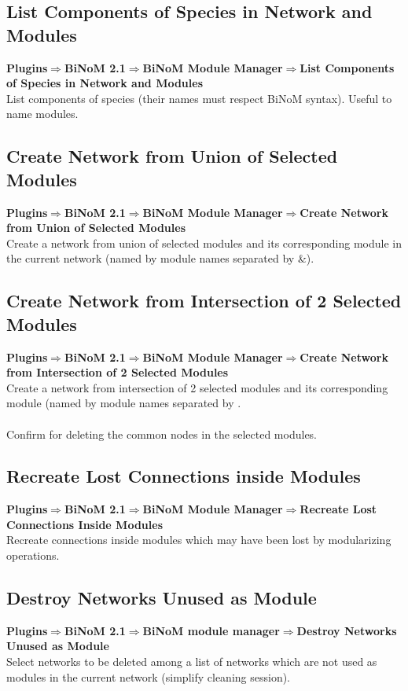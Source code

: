 \subsection{List Components of Species in Network and Modules}
\textbf{Plugins$\Rightarrow$BiNoM 2.1$\Rightarrow$BiNoM Module Manager$\Rightarrow$List Components of Species in Network and Modules}\\
List components of species (their names must respect BiNoM syntax). Useful to name modules.

\subsection{Create Network from Union of Selected Modules}
\textbf{Plugins$\Rightarrow$BiNoM 2.1$\Rightarrow$BiNoM Module Manager$\Rightarrow$Create Network from Union of Selected Modules}\\
Create a network from union of selected modules and its corresponding module in the current network (named by module names separated by \&).

\subsection{Create Network from Intersection of 2 Selected Modules}
\textbf{Plugins$\Rightarrow$BiNoM 2.1$\Rightarrow$BiNoM Module Manager$\Rightarrow$Create Network from Intersection of 2 Selected Modules}\\
Create a network from intersection of 2 selected modules and its corresponding module (named by module names separated by \textbar.\\\\
Confirm for deleting the common nodes in the selected modules.

\subsection{Recreate Lost Connections inside Modules}
\textbf{Plugins$\Rightarrow$BiNoM 2.1$\Rightarrow$BiNoM Module Manager$\Rightarrow$Recreate Lost Connections Inside Modules}\\
Recreate connections inside modules which may have been lost by modularizing operations.

\subsection{Destroy Networks Unused as Module}
\textbf{Plugins$\Rightarrow$BiNoM 2.1$\Rightarrow$BiNoM module manager$\Rightarrow$Destroy Networks Unused as Module}\\
Select networks to be deleted among a list of networks which are not used as modules in the current network (simplify cleaning session).
